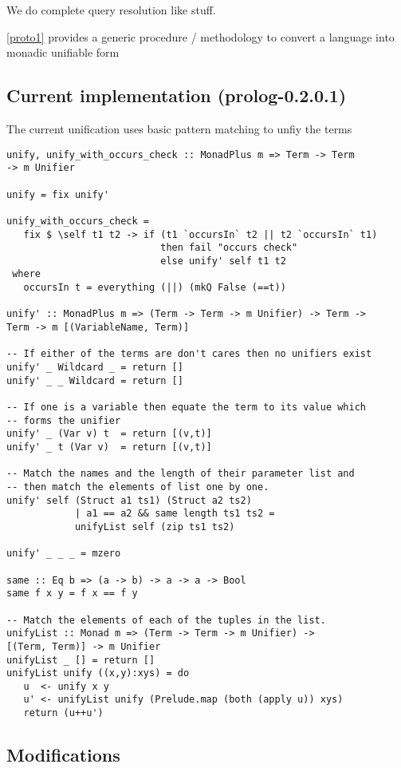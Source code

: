 \documentclass[thesis-solanki.tex]{subfiles}
\begin{document}
We do complete  query resolution like stuff.

\ref{proto1} provides a generic procedure / methodology to convert a language into monadic unifiable form 


\subsection{Current implementation (prolog-0.2.0.1)}
The current unification uses basic pattern matching to unfiy the terms 


\begin{verbatim}
unify, unify_with_occurs_check :: MonadPlus m => Term -> Term 
-> m Unifier

unify = fix unify'

unify_with_occurs_check =
   fix $ \self t1 t2 -> if (t1 `occursIn` t2 || t2 `occursIn` t1)
                           then fail "occurs check"
                           else unify' self t1 t2
 where
   occursIn t = everything (||) (mkQ False (==t))

unify' :: MonadPlus m => (Term -> Term -> m Unifier) -> Term -> 
Term -> m [(VariableName, Term)]

-- If either of the terms are don't cares then no unifiers exist
unify' _ Wildcard _ = return []
unify' _ _ Wildcard = return []

-- If one is a variable then equate the term to its value which 
-- forms the unifier
unify' _ (Var v) t  = return [(v,t)]
unify' _ t (Var v)  = return [(v,t)]

-- Match the names and the length of their parameter list and 
-- then match the elements of list one by one. 
unify' self (Struct a1 ts1) (Struct a2 ts2) 
            | a1 == a2 && same length ts1 ts2 = 
            unifyList self (zip ts1 ts2)

unify' _ _ _ = mzero

same :: Eq b => (a -> b) -> a -> a -> Bool
same f x y = f x == f y

-- Match the elements of each of the tuples in the list. 
unifyList :: Monad m => (Term -> Term -> m Unifier) -> 
[(Term, Term)] -> m Unifier
unifyList _ [] = return []
unifyList unify ((x,y):xys) = do
   u  <- unify x y
   u' <- unifyList unify (Prelude.map (both (apply u)) xys)
   return (u++u')
\end{verbatim} 


\subsection{Modifications}
\end{document}

